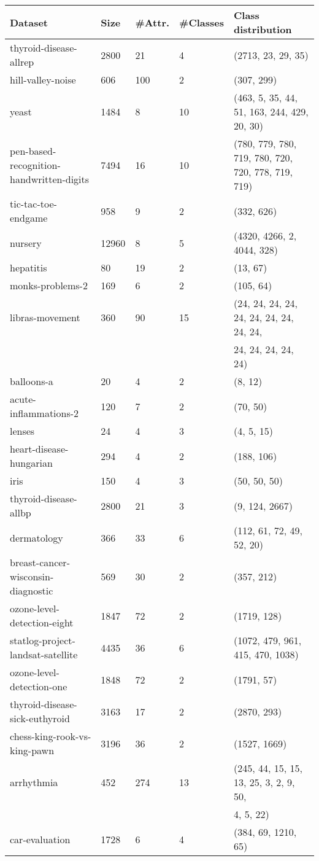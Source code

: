 \documentclass{article}%
\begin{document}
%
\normalsize%
\begin{longtable}{l l l l l}%
\hline%
Dataset&Size&\#Attr.&\#Classes&Class distribution\\%
\hline%
\hline%
thyroid{-}disease{-}allrep&2800&21&4&(2713, 23, 29, 35)\\%
hill{-}valley{-}noise&606&100&2&(307, 299)\\%
yeast&1484&8&10&(463, 5, 35, 44, 51, 163, 244, 429, 20, 30)\\%
pen{-}based{-}recognition{-}handwritten{-}digits&7494&16&10&(780, 779, 780, 719, 780, 720, 720, 778, 719, 719)\\%
tic{-}tac{-}toe{-}endgame&958&9&2&(332, 626)\\%
nursery&12960&8&5&(4320, 4266, 2, 4044, 328)\\%
hepatitis&80&19&2&(13, 67)\\%
monks{-}problems{-}2&169&6&2&(105, 64)\\%
libras{-}movement&360&90&15&(24, 24, 24, 24, 24, 24, 24, 24, 24, 24,\\%
&&&&24, 24, 24, 24, 24)\\%
balloons{-}a&20&4&2&(8, 12)\\%
acute{-}inflammations{-}2&120&7&2&(70, 50)\\%
lenses&24&4&3&(4, 5, 15)\\%
heart{-}disease{-}hungarian&294&4&2&(188, 106)\\%
iris&150&4&3&(50, 50, 50)\\%
thyroid{-}disease{-}allbp&2800&21&3&(9, 124, 2667)\\%
dermatology&366&33&6&(112, 61, 72, 49, 52, 20)\\%
breast{-}cancer{-}wisconsin{-}diagnostic&569&30&2&(357, 212)\\%
ozone{-}level{-}detection{-}eight&1847&72&2&(1719, 128)\\%
statlog{-}project{-}landsat{-}satellite&4435&36&6&(1072, 479, 961, 415, 470, 1038)\\%
ozone{-}level{-}detection{-}one&1848&72&2&(1791, 57)\\%
thyroid{-}disease{-}sick{-}euthyroid&3163&17&2&(2870, 293)\\%
chess{-}king{-}rook{-}vs{-}king{-}pawn&3196&36&2&(1527, 1669)\\%
arrhythmia&452&274&13&(245, 44, 15, 15, 13, 25, 3, 2, 9, 50,\\%
&&&&4, 5, 22)\\%
car{-}evaluation&1728&6&4&(384, 69, 1210, 65)\\%

\end{longtable}
\end{document}
